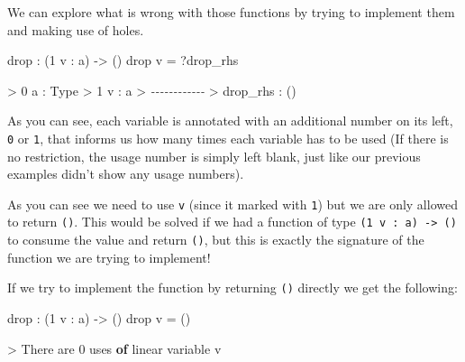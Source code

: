 \documentclass[
]{article}
\newenvironment{Shaded}{}{}
\newcommand{\CommentTok}[1]{\textcolor[rgb]{0.38,0.63,0.69}{\textit{#1}}}
\newcommand{\DataTypeTok}[1]{\textcolor[rgb]{0.56,0.13,0.00}{#1}}
\newcommand{\DecValTok}[1]{\textcolor[rgb]{0.25,0.63,0.44}{#1}}
\newcommand{\FunctionTok}[1]{\textcolor[rgb]{0.02,0.16,0.49}{#1}}
\newcommand{\KeywordTok}[1]{\textcolor[rgb]{0.00,0.44,0.13}{\textbf{#1}}}
\newcommand{\NormalTok}[1]{#1}
\newcommand{\OperatorTok}[1]{\textcolor[rgb]{0.40,0.40,0.40}{#1}}
\newcommand{\OtherTok}[1]{\textcolor[rgb]{0.00,0.44,0.13}{#1}}
\begin{document}
We can explore what is wrong with those functions by trying to implement
them and making use of holes.

\begin{Shaded}
\begin{Highlighting}[]
\FunctionTok{drop} \OperatorTok{:}\NormalTok{ (}\DecValTok{1}\NormalTok{ v }\OperatorTok{:}\NormalTok{ a) }\OtherTok{{-}\textgreater{}}\NormalTok{ ()}
\FunctionTok{drop}\NormalTok{ v }\OtherTok{=} \OperatorTok{?}\NormalTok{drop\_rhs}
\end{Highlighting}
\end{Shaded}

\begin{Shaded}
\begin{Highlighting}[]
\OperatorTok{\textgreater{}} \DecValTok{0}\NormalTok{ a }\OperatorTok{:} \DataTypeTok{Type}
\OperatorTok{\textgreater{}} \DecValTok{1}\NormalTok{ v }\OperatorTok{:}\NormalTok{ a}
\OperatorTok{\textgreater{}} \CommentTok{{-}{-}{-}{-}{-}{-}{-}{-}{-}{-}{-}{-}}
\OperatorTok{\textgreater{}}\NormalTok{ drop\_rhs }\OperatorTok{:}\NormalTok{ ()}
\end{Highlighting}
\end{Shaded}

As you can see, each variable is annotated with an additional number on
its left, \texttt{0} or \texttt{1}, that informs us how many times each
variable has to be used (If there is no restriction, the usage number is
simply left blank, just like our previous examples didn't show any usage
numbers).

As you can see we need to use \texttt{v} (since it marked with
\texttt{1}) but we are only allowed to return \texttt{()}. This would be
solved if we had a function of type
\texttt{(1\ v\ :\ a)\ -\textgreater{}\ ()} to consume the value and
return \texttt{()}, but this is exactly the signature of the function we
are trying to implement!

If we try to implement the function by returning \texttt{()} directly we
get the following:

\begin{Shaded}
\begin{Highlighting}[]
\FunctionTok{drop} \OperatorTok{:}\NormalTok{ (}\DecValTok{1}\NormalTok{ v }\OperatorTok{:}\NormalTok{ a) }\OtherTok{{-}\textgreater{}}\NormalTok{ ()}
\FunctionTok{drop}\NormalTok{ v }\OtherTok{=}\NormalTok{ ()}
\end{Highlighting}
\end{Shaded}

\begin{Shaded}
\begin{Highlighting}[]
\OperatorTok{\textgreater{}} \DataTypeTok{There}\NormalTok{ are }\DecValTok{0}\NormalTok{ uses }\KeywordTok{of}\NormalTok{ linear variable v}
\end{Highlighting}
\end{Shaded}
\end{document}
